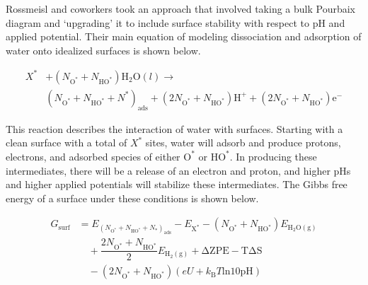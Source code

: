 \documentclass[11pt]{article}
\begin{document}
Rossmeisl and coworkers took an approach that involved taking a bulk
Pourbaix diagram and `upgrading' it to include surface stability with
respect to pH and applied potential.
Their main equation of modeling dissociation and adsorption of water
onto idealized surfaces is shown below.

\begin{equation}\begin{split}
X^\ast &+ (N_{\mathrm{O^\ast}} + N_{\mathrm{HO^\ast}})\mathrm{H_2O}(l)
\rightarrow \\
& (N_{\mathrm{O^\ast}} + N_{\mathrm{HO^\ast}} +
N^\ast)_{\mathrm{ads}} + (2N_{\mathrm{O^\ast}} +
N_{\mathrm{HO^\ast}})\mathrm{H^+} + (2N_{\mathrm{O^\ast}} + N_{\mathrm{HO^\ast}})\mathrm{e^-}
\end{split}\end{equation}

This reaction describes the interaction of water with
surfaces. Starting with a clean surface with a total of $X^\ast$
sites, water will adsorb and produce protons, electrons, and adsorbed
species of either $\mathrm{O^{\ast}}$ or $\mathrm{HO^{\ast}}$. In producing these
intermediates, there will be a release of an electron and proton, and
higher pHs and higher applied potentials will stabilize these
intermediates. The Gibbs free energy of a surface under these
conditions is shown below.

\begin{equation}
\begin{split}
G_{\mathrm{surf}} &= E_{(N_{\mathrm{O^\ast}} + N_{\mathrm{HO^\ast}} + N_\ast)_{\mathrm{ads}}} - E_{\mathrm{X^{\ast}}} -
(N_{\mathrm{O^\ast}} + N_{\mathrm{HO^\ast}}) E_{\mathrm{H_2O(g)}} \\ 
&\quad + \dfrac{2N_{\mathrm{O^\ast}} +
N_{\mathrm{HO^\ast}}}{2} E_{\mathrm{H_2(g)}} + \mathrm{\Delta ZPE -
T\Delta S} \\
&\quad - (2N_{\mathrm{O^\ast}} + N_{\mathrm{HO^\ast}})(eU +
k_\mathrm{B}T\mathrm{ln}10\mathrm{pH})
\end{split}
\end{equation}
\end{document}
